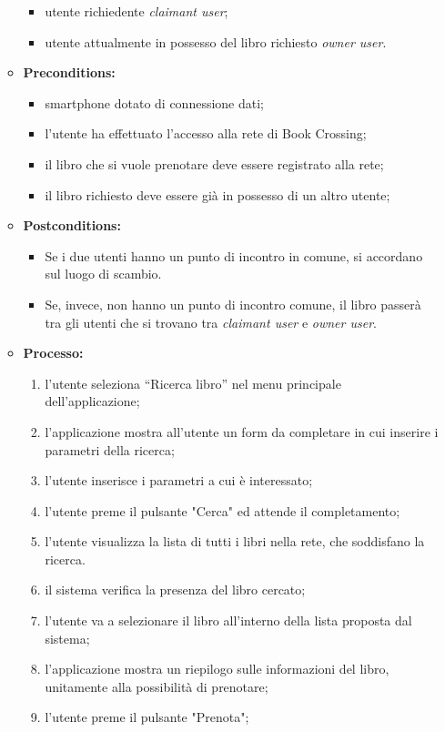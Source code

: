 \begin{itemize}
\begin{itemize}
		\begin{itemize}
			\item utente richiedente \textit{claimant user};
			\item utente attualmente in possesso del libro richiesto \textit{owner user}.
		\end{itemize}
		\item \textbf{Preconditions:}
		\begin{itemize}
			\item smartphone dotato di connessione dati;
			\item l’utente ha effettuato l’accesso alla rete di Book Crossing;
			\item il libro che si vuole prenotare deve essere registrato alla rete;
			\item il libro richiesto deve essere già in possesso di un altro utente;
		\end{itemize}
		\item \textbf{Postconditions:}
		\begin{itemize}
			\item Se i due utenti hanno un punto di incontro in comune, si accordano sul luogo di scambio. 
			\item Se, invece, non hanno un punto di incontro comune, il libro passerà tra gli utenti che si trovano tra \textit{claimant user} e \textit{owner user}.
		\end{itemize}
		\item \textbf{Processo:}
		\begin{enumerate}
			\item l’utente seleziona “Ricerca libro” nel menu principale dell’applicazione;
			\item l’applicazione mostra all'utente un form da completare in cui inserire i parametri della ricerca;
			\item l’utente inserisce i parametri a cui è interessato;
			\item l'utente preme il pulsante "Cerca" ed attende il completamento;
			\item l'utente visualizza la lista di tutti i libri nella rete, che soddisfano la ricerca.
			\item il sistema verifica la presenza del libro cercato;
			\item l'utente va a selezionare il libro all'interno della lista proposta dal sistema;
			\item l'applicazione mostra un riepilogo sulle informazioni del libro, unitamente alla possibilità di prenotare;
			\item l'utente preme il pulsante "Prenota";

\end{enumerate}
\end{itemize}
\end{itemize}
